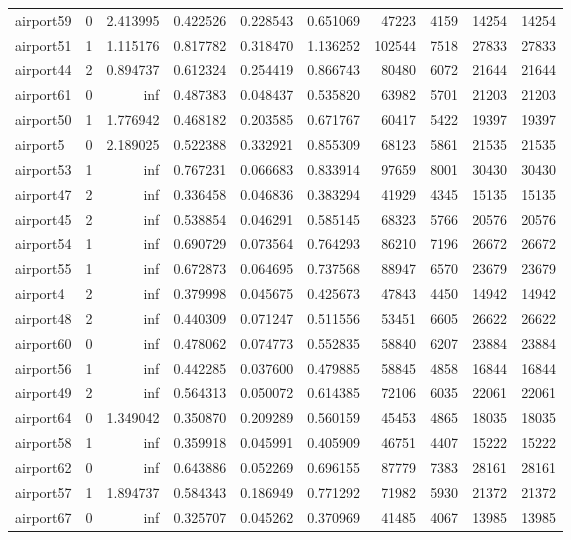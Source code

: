 \begin{longtable}{|l|r|r|r|r|r|r|r|r|r|}
airport59 & 0 & 2.413995 & 0.422526 & 0.228543 & 0.651069 & 47223 & 4159 & 14254 & 14254 \\
airport51 & 1 & 1.115176 & 0.817782 & 0.318470 & 1.136252 & 102544 & 7518 & 27833 & 27833 \\
airport44 & 2 & 0.894737 & 0.612324 & 0.254419 & 0.866743 & 80480 & 6072 & 21644 & 21644 \\
airport61 & 0 & inf & 0.487383 & 0.048437 & 0.535820 & 63982 & 5701 & 21203 & 21203 \\
airport50 & 1 & 1.776942 & 0.468182 & 0.203585 & 0.671767 & 60417 & 5422 & 19397 & 19397 \\
airport5 & 0 & 2.189025 & 0.522388 & 0.332921 & 0.855309 & 68123 & 5861 & 21535 & 21535 \\
airport53 & 1 & inf & 0.767231 & 0.066683 & 0.833914 & 97659 & 8001 & 30430 & 30430 \\
airport47 & 2 & inf & 0.336458 & 0.046836 & 0.383294 & 41929 & 4345 & 15135 & 15135 \\
airport45 & 2 & inf & 0.538854 & 0.046291 & 0.585145 & 68323 & 5766 & 20576 & 20576 \\
airport54 & 1 & inf & 0.690729 & 0.073564 & 0.764293 & 86210 & 7196 & 26672 & 26672 \\
airport55 & 1 & inf & 0.672873 & 0.064695 & 0.737568 & 88947 & 6570 & 23679 & 23679 \\
airport4 & 2 & inf & 0.379998 & 0.045675 & 0.425673 & 47843 & 4450 & 14942 & 14942 \\
airport48 & 2 & inf & 0.440309 & 0.071247 & 0.511556 & 53451 & 6605 & 26622 & 26622 \\
airport60 & 0 & inf & 0.478062 & 0.074773 & 0.552835 & 58840 & 6207 & 23884 & 23884 \\
airport56 & 1 & inf & 0.442285 & 0.037600 & 0.479885 & 58845 & 4858 & 16844 & 16844 \\
airport49 & 2 & inf & 0.564313 & 0.050072 & 0.614385 & 72106 & 6035 & 22061 & 22061 \\
airport64 & 0 & 1.349042 & 0.350870 & 0.209289 & 0.560159 & 45453 & 4865 & 18035 & 18035 \\
airport58 & 1 & inf & 0.359918 & 0.045991 & 0.405909 & 46751 & 4407 & 15222 & 15222 \\
airport62 & 0 & inf & 0.643886 & 0.052269 & 0.696155 & 87779 & 7383 & 28161 & 28161 \\
airport57 & 1 & 1.894737 & 0.584343 & 0.186949 & 0.771292 & 71982 & 5930 & 21372 & 21372 \\
airport67 & 0 & inf & 0.325707 & 0.045262 & 0.370969 & 41485 & 4067 & 13985 & 13985 \\

\end{longtable}
